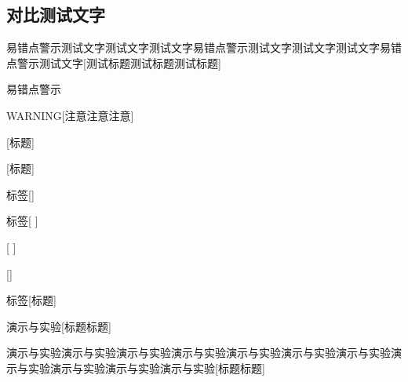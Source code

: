 \documentclass[color=blue]{textbook-cn}%
\begin{document}
\begin{Project}
\subsection*{对比测试文字}

\begin{box1}{易错点警示测试文字测试文字测试文字易错点警示测试文字测试文字测试文字易错点警示测试文字}[测试标题测试标题测试标题]
\lipsum[2]
\end{box1}


\begin{box1}{易错点警示}
\lipsum[2]
\end{box1}

\begin{Warning}
	\lipsum[2]
\end{Warning}


\begin{box1}{WARNING}[注意注意注意]
	\lipsum[2]
\end{box1}


\begin{box1}{}[标题]
	\lipsum[2][1-3]
\end{box1}

\begin{box1}{ }[标题]
	\lipsum[2][1-3]
\end{box1}

\begin{box1}{标签}[]
	\lipsum[2][1-3]
\end{box1}

\begin{box1}{标签}[ ]
	\lipsum[2][1-3]
\end{box1}

\begin{box1}{ }[ ]
	\lipsum[2][1-3]
\end{box1}

\begin{box1}{}[]
	\lipsum[2][1-3]
\end{box1}

\begin{box1}{标签}[标题]
	\lipsum[2][1-3]
\end{box1}




\begin{box2}{演示与实验}[标题标题]
	\lipsum[2]
\end{box2}


\begin{box2}{演示与实验演示与实验演示与实验演示与实验演示与实验演示与实验演示与实验演示与实验演示与实验演示与实验演示与实验}[标题标题]
	\lipsum[2]
\end{box2}


\end{Project}
\end{document}
